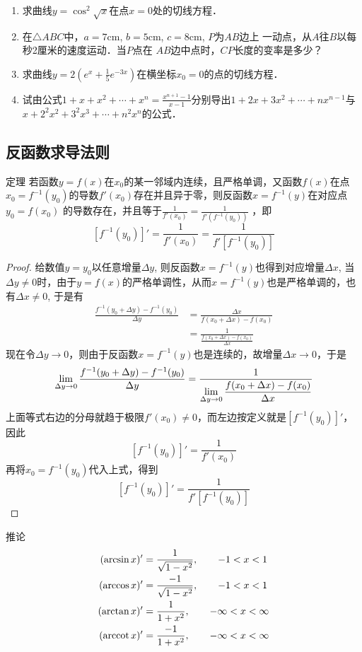\begin{ex}
\begin{enumerate}
\item 求曲线$y=\cos^2\sqrt{x}$在点$x=0$处的切线方程．
\item 在$\triangle ABC$中，$a=7$cm, $b=5$cm, $c=8$cm, $P$为$AB$边上
一动点，从$A$往$B$以每秒2厘米的速度运动．当$P$点在
$AB$边中点时，$CP$长度的变率是多少？
\item 求曲线$y=2\left(e^x+\frac{1}{5}e^{-3x}\right)$在横坐标$x_0=0$的点的切线方程．
\item 试由公式$1+x+x^2+\cdots+x^n=\frac{x^{n+1}-1}{x-1}$分别导出$1+2x+3x^2+\cdots+nx^{n-1}$与$x+2^2x^2+3^2x^3+\cdots +n^2x^n$的公式．
\end{enumerate}  
\end{ex}


\subsection{反函数求导法则}

\begin{blk}
    {定理} 若函数$y=f(x)$在$x_0$的某一邻域内连续，且严格单调，又函数$f(x)$在点$x_0=f^{-1}(y_0)$的导数$f'(x_0)$存在并且异于零，则反函数$x=f^{-1}(y)$在对应点$y_0=f(x_0)$
的导数存在，并且等于$\frac{1}{f'(x_0)}=\frac{1}{f'(f^{-1}(y_0))}$
，即
\[[f^{-1}(y_0)]'=\frac{1}{f'(x_0)}=\frac{1}{f'[f^{-1}(y_0)]}\]
\end{blk}

\begin{proof}
给数值$y=y_0$以任意增量$\Delta y$, 则反函数$x=f^{-1}(y)$也得到对应增量$\Delta x$, 当$\Delta y\ne 0$时，由于$y=f(x)$的严格单调性，从而$x=f^{-1}(y)$也是严格单调的，也有$\Delta x\ne 0$, 于是有
\[\begin{split}
    \frac{f^{-1}(y_0+\Delta y)-f^{-1}(y_0)}{\Delta y}&=\frac{\Delta x}{f(x_0+\Delta x)-f(x_0)}\\
    &=\frac{1}{\frac{f(x_0+\Delta x)-f(x_0)}{\Delta x}}
\end{split}\]
现在令$\Delta y\to 0$，则由于反函数$x=f^{-1}(y)$也是连续的，故增量$\Delta x\to 0$，于是
\[\lim_{\Delta y\to 0}\dfrac{f^{-1}(y_0+\Delta y)-f^{-1}(y_0)}{\Delta y}=\dfrac{1}{\displaystyle\lim_{\Delta y\to 0}\dfrac{f(x_0+\Delta x)-f(x_0)}{\Delta x}}\]
上面等式右边的分母就趋于极限$f'(x_0)\ne 0$，而左边按定义就是$[f^{-1}(y_0)]'$，因此
\[[f^{-1}(y_0)]'=\frac{1}{f'(x_0)}\]
再将$x_0=f^{-1}(y_0)$代入上式，得到
\[[f^{-1}(y_0)]'=\frac{1}{f'[f^{-1}(y_0)]}\]
\end{proof}

\begin{blk}{推论}
\[\begin{split}
    (\arcsin x)'&=\frac{1}{\sqrt{1-x^2}},\qquad -1<x<1\\
    (\arccos x)'&=\frac{-1}{\sqrt{1-x^2}},\qquad -1<x<1\\
    (\arctan x)'&=\frac{1}{{1+x^2}},\qquad -\infty<x<\infty\\
    (\arccot x)'&=\frac{-1}{{1+x^2}},\qquad -\infty<x<\infty\\
\end{split}\]
\end{blk}

